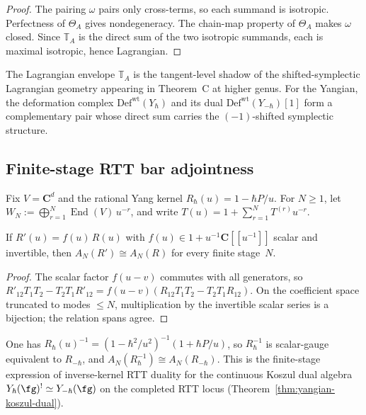 \begin{proof}
The pairing $\omega$ pairs only cross-terms, so each summand is
isotropic. Perfectness of $\Theta_A$ gives nondegeneracy. The
chain-map property of $\Theta_A$ makes $\omega$ closed. Since
$\mathbb{T}_A$ is the direct sum of the two isotropic summands,
each is maximal isotropic, hence Lagrangian.
\end{proof}

\begin{remark}
\label{rem:lagrangian-envelope-ambient}
The Lagrangian envelope $\mathbb{T}_A$ is the tangent-level
shadow of the shifted-symplectic Lagrangian geometry appearing in
Theorem~C at higher genus. For the Yangian, the deformation
complex $\mathrm{Def}^{\mathrm{wt}}(Y_\hbar)$ and its dual
$\mathrm{Def}^{\mathrm{wt}}(Y_{-\hbar})[1]$ form a complementary
pair whose direct sum carries the $(-1)$-shifted symplectic
structure.
\end{remark}


\subsection{Finite-stage RTT bar adjointness}
\label{subsec:finite-stage-rtt-adjointness}

Fix $V = \mathbf{C}^d$ and the rational Yang kernel
$R_\hbar(u) = 1 - \hbar P/u$.
For $N \ge 1$, let
$W_N := \bigoplus_{r=1}^{N} \operatorname{End}(V)\,u^{-r}$,
and write $T(u) = 1 + \sum_{r=1}^{N} T^{(r)} u^{-r}$.

\begin{lemma}
\label{lem:shifted-rtt-scalar-gauge}
If $R'(u) = f(u)\,R(u)$ with
$f(u) \in 1 + u^{-1}\mathbf{C}[[u^{-1}]]$ scalar and invertible,
then $A_N(R') \cong A_N(R)$ for every finite stage~$N$.
\end{lemma}

\begin{proof}
The scalar factor $f(u-v)$ commutes with all generators, so
$R'_{12}T_1T_2 - T_2T_1R'_{12} = f(u-v)(R_{12}T_1T_2 - T_2T_1R_{12})$.
On the coefficient space truncated to modes $\le N$, multiplication
by the invertible scalar series is a bijection; the relation spans
agree.
\end{proof}

\begin{corollary}
\label{cor:shifted-rtt-inverse-sign}
One has
$R_\hbar(u)^{-1} = (1 - \hbar^2/u^2)^{-1}(1 + \hbar P/u)$,
so $R_\hbar^{-1}$ is scalar-gauge equivalent to $R_{-\hbar}$,
and $A_N(R_\hbar^{-1}) \cong A_N(R_{-\hbar})$. This is the
finite-stage expression of inverse-kernel RTT duality for the
continuous Koszul dual algebra
$Y_\hbar(\fg)^! \simeq Y_{-\hbar}(\fg)$ on the completed RTT locus
(Theorem~\textup{\ref{thm:yangian-koszul-dual}}).
\end{corollary}


